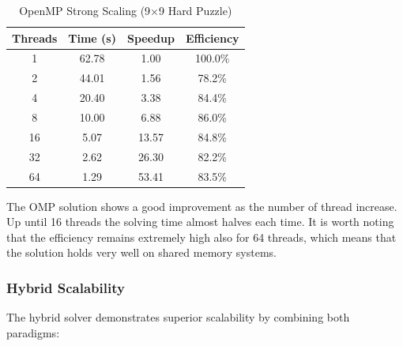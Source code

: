 \begin{table}[htbp]
\caption{OpenMP Strong Scaling (9×9 Hard Puzzle)}
\begin{center}
\begin{tabular}{@{}cccc@{}}
\toprule
\textbf{Threads} & \textbf{Time (s)} & \textbf{Speedup} & \textbf{Efficiency} \\
\midrule
1  & 62.78 & 1.00  & 100.0\% \\
2  & 44.01 & 1.56  & 78.2\% \\
4  & 20.40 & 3.38  & 84.4\% \\
8  & 10.00 & 6.88  & 86.0\% \\
16 & 5.07  & 13.57 & 84.8\% \\
32 & 2.62  & 26.30 & 82.2\% \\
64 & 1.29  & 53.41 & 83.5\% \\
\bottomrule
\end{tabular}
\end{center}
\label{tab:omp_scaling}
\end{table}

The OMP solution shows a good improvement as the number of thread increase. Up until 16 threads the solving time almost halves each time. It is worth noting that the efficiency remains extremely high also for 64 threads, which means that the solution holds very well on shared memory systems.


\subsubsection{Hybrid Scalability}
\label{subsubsec:hybrid_scalability}
The hybrid solver demonstrates superior scalability by combining both paradigms:

